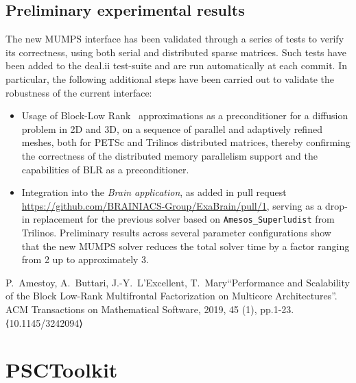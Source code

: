 \documentclass[a4paper,12pt]{article}
\begin{document}
\subsection{Preliminary experimental results}
The new MUMPS interface has been validated through a series of tests
to verify its correctness, using both serial and distributed sparse matrices. Such tests
have been added to the deal.ii test-suite and are run automatically at
each commit. In particular, the following additional steps have
been carried out to validate the robustness of the current interface:
\begin{itemize}
    \item Usage of Block-Low Rank~\cite{blr} approximations as a preconditioner
          for a diffusion problem in 2D and 3D, on a sequence of parallel and
          adaptively refined meshes, both for PETSc and Trilinos distributed matrices, thereby
          confirming the correctness of the distributed memory parallelism
          support and the capabilities of BLR as a preconditioner.
    \item Integration into the \emph{Brain application}, as added
          in pull request \url{https://github.com/BRAINIACS-Group/ExaBrain/pull/1}, serving as a
          drop-in replacement for the previous solver based on \texttt{Amesos\_Superludist}
          from Trilinos. Preliminary results across several
          parameter configurations show that the new MUMPS solver
          reduces the total solver time by a factor
          ranging from 2 up to approximately 3.

\end{itemize}



\begin{thebibliography}{10}
 P.~Amestoy, A.~Buttari, J.-Y.~L'Excellent,
  T.~Mary``Performance and Scalability of the Block Low-Rank
  Multifrontal Factorization on Multicore Architectures''. ACM
  Transactions on Mathematical Software, 2019, 45 (1),
  pp.1-23. ⟨10.1145/3242094⟩
\end{thebibliography}



\newpage

\section{PSCToolkit}
\label{sec:section3}
\end{document}
